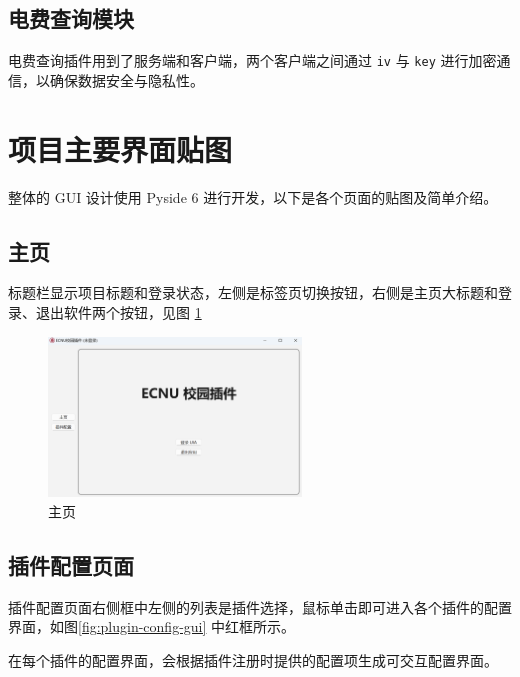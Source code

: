 \documentclass[14pt,a4paper,UTF8,twoside]{article}
\begin{document}
\subsection{电费查询模块}

电费查询插件用到了服务端和客户端，两个客户端之间通过 \verb`iv` 与 \verb`key` 进行加密通信，以确保数据安全与隐私性。

\newpage{}

\section{项目主要界面贴图}

整体的 GUI 设计使用 Pyside 6 进行开发，以下是各个页面的贴图及简单介绍。

\subsection{主页}

标题栏显示项目标题和登录状态，左侧是标签页切换按钮，右侧是主页大标题和登录、退出软件两个按钮，见图 \ref{fig:home}

\begin{figure}[H]
    \centering
    \includegraphics[width=0.6\textwidth]{img/home}
    \caption{主页}
    \label{fig:home}
\end{figure}

\subsection{插件配置页面}\label{subsubsec:gui-plugin-config}

插件配置页面右侧框中左侧的列表是插件选择，鼠标单击即可进入各个插件的配置界面，如图\ref{fig:plugin-config-gui} 中红框所示。

在每个插件的配置界面，会根据插件注册时提供的配置项生成可交互配置界面。
\end{document}
